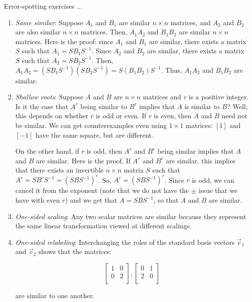 \documentclass[10pt]{amsart}
\begin{document}
Error-spotting exercises ...

\begin{enumerate}
\item {\em Same similar}: Suppose $A_1$ and $B_1$ are similar $n
  \times n$ matrices, and $A_2$ and $B_2$ are also similar $n \times
  n$ matrices. Then, $A_1A_2$ and $B_1B_2$ are similar $n \times n$
  matrices. Here is the proof: since $A_1$ and $B_1$ are similar,
  there exists a matrix $S$ such that $A_1 = SB_1S^{-1}$. Since $A_2$
  and $B_2$ are similar, there exists a matrix $S$ such that $A_2 =
  SB_2S^{-1}$. Then, $A_1A_2 = (SB_1S^{-1})(SB_2S^{-1}) =
  S(B_1B_2)S^{-1}$. Thus, $A_1A_2$ and $B_1B_2$ are similar.
\item {\em Shallow roots}: Suppose $A$ and $B$ are $n \times n$
  matrices and $r$ is a positive integer. Is it the case that $A^r$
  being similar to $B^r$ implies that $A$ is similar to $B$? Well,
  this depends on whether $r$ is odd or even. If $r$ is even, then $A$
  and $B$ need not be similar. We can get counterexamples even using
  $1 \times 1$ matrices: $[1]$ and $[-1]$ have the same square, but
  are different.

  On the other hand, if $r$ is odd, then $A^r$ and $B^r$ being similar
  implies that $A$ and $B$ are similar. Here is the proof. If $A^r$
  and $B^r$ are similar, this implies that there exists an invertible
  $n \times n$ matrix $S$ such that $A^r = SB^rS^{-1} =
  (SBS^{-1})^r$. So, $A^r = (SBS^{-1})^r$. Since $r$ is odd, we can
  cancel it from the exponent (note that we do not have the $\pm$
  issue that we have with even $r$) and we get that $A = SBS^{-1}$, so
  that $A$ and $B$ are similar.
\item {\em One-sided scaling}: Any two scalar matrices are similar
  because they represent the same linear transformation viewed at
  different scalings.
\item {\em One-sided relabeling}: Interchanging the roles of the
  standard basis vectors $\vec{e}_1$ and $\vec{e}_2$ shows that the
  matrices:

  $$\left[\begin{matrix} 1 & 0 \\ 0 & 2 \\\end{matrix}\right], \left[\begin{matrix} 0 & 1 \\ 2 & 0 \\\end{matrix}\right]$$

  are similar to one another.
\end{enumerate}
\end{document}
